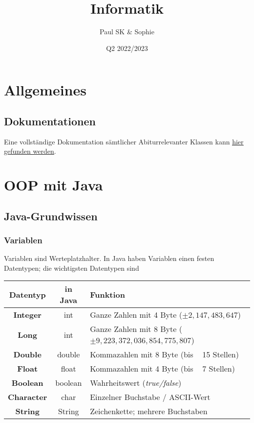 \documentclass{article}
\title{Informatik}
\date{Q2 2022/2023}
\author{Paul SK \& Sophie}
\begin{document}
	\maketitle
	\newpage


	\section{Allgemeines}
	\subsection{Dokumentationen}
	Eine vollständige Dokumentation sämtlicher Abiturrelevanter Klassen kann \href{https://www.schulentwicklung.nrw.de/lehrplaene/upload/klp\_SII/if/Dokumentation\_ZA-IF\_GK-LK\_ab\_2018\_2021\_12\_22.pdf}{\underline{hier gefunden werden}}.

	\section{OOP mit Java}
	\subsection{Java-Grundwissen}
	\subsubsection{Variablen}
	Variablen sind Werteplatzhalter. In Java haben Variablen einen festen Datentypen; die wichtigsten Datentypen sind 

	\begin{center}
		\def\arraystretch{1.1}
		\begin{tabular}{ | c | c | l | }
			\hline
			\textbf{Datentyp} 	& \textbf{in Java} 	& \textbf{Funktion} \\
			\hline
			\hline
			\textbf{Integer}	& int				& Ganze Zahlen mit 4 Byte ($\pm 2,147,483,647$) \\
			\textbf{Long}		& int				& Ganze Zahlen mit 8 Byte ($\pm 9,223,372,036,854,775,807$) \\
			\textbf{Double} 	& double			& Kommazahlen mit 8 Byte (bis ~ 15 Stellen) \\
			\textbf{Float} 		& float 			& Kommazahlen mit 4 Byte (bis ~ 7 Stellen) \\
			\textbf{Boolean}	& boolean			& Wahrheitswert (\textit{true/false}) \\
			\textbf{Character} 	& char 				& Einzelner Buchstabe / ASCII-Wert \\
			\textbf{String} 	& String 			& Zeichenkette; mehrere Buchstaben \\
			\hline
		\end{tabular}
	\end{center}
\end{document}
